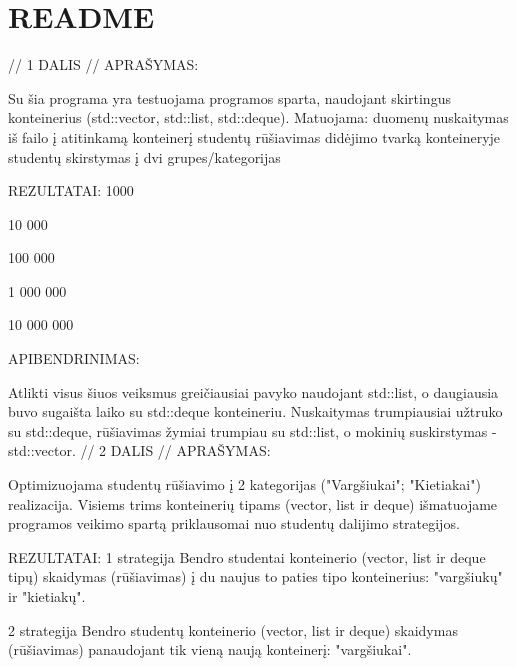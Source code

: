 \chapter{README}
\hypertarget{md__c_1_2_darbai_22___o_p_2_r_e_a_d_m_e}{}\label{md__c_1_2_darbai_22___o_p_2_r_e_a_d_m_e}
// 1 DALIS // APRAŠ\+YMAS\+:

Su šia programa yra testuojama programos sparta, naudojant skirtingus konteinerius (std\+::vector, std\+::list, std\+::deque). Matuojama\+: duomenų nuskaitymas iš failo į atitinkamą konteinerį studentų rūšiavimas didėjimo tvarką konteineryje studentų skirstymas į dvi grupes/kategorijas

REZULTATAI\+: 1000

 

10 000

 

100 000

 

1 000 000

 

10 000 000

 

APIBENDRINIMAS\+:



Atlikti visus šiuos veiksmus greičiausiai pavyko naudojant std\+::list, o daugiausia buvo sugaišta laiko su std\+::deque konteineriu. Nuskaitymas trumpiausiai užtruko su std\+::deque, rūšiavimas žymiai trumpiau su std\+::list, o mokinių suskirstymas -\/ std\+::vector. // 2 DALIS // APRAŠ\+YMAS\+:

Optimizuojama studentų rūšiavimo į 2 kategorijas ("{}\+Vargšiukai"{}; "{}\+Kietiakai"{}) realizacija. Visiems trims konteinerių tipams (vector, list ir deque) išmatuojame programos veikimo spartą priklausomai nuo studentų dalijimo strategijos.

REZULTATAI\+: 1 strategija Bendro studentai konteinerio (vector, list ir deque tipų) skaidymas (rūšiavimas) į du naujus to paties tipo konteinerius\+: "{}vargšiukų"{} ir "{}kietiakų"{}.











2 strategija Bendro studentų konteinerio (vector, list ir deque) skaidymas (rūšiavimas) panaudojant tik vieną naują konteinerį\+: "{}vargšiukai"{}.











